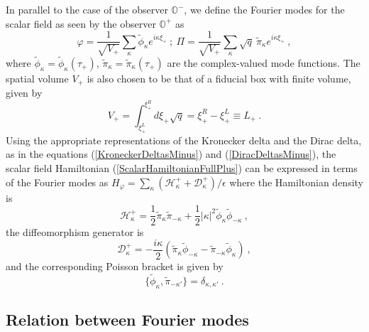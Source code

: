\documentclass[aps,twocolumn,showpacs]{revtex4}
\def\kr{\kappa}
\def\observerminus{\mathbb{O}^{-}}
\def\observerplus{\mathbb{O}^{+}}
\begin{document}
In parallel to the case of the observer $\observerminus$, we define the 
Fourier modes for the scalar field as seen by the observer $\observerplus$
as
%
\begin{equation}\label{FourierModesDefinitionPlus}
\varphi =  \frac{1}{\sqrt{V_{+}}}\sum_{\kr} \tilde{\phi}_{\kr} 
e^{i \kr \xi_{+}} ~;~
\Pi =  \frac{1}{\sqrt{V_{+}}} \sum_{\kr} \sqrt{q}~ \tilde{\pi}_{\kr} 
e^{i \kr \xi_{+}} ~,
\end{equation}
%
where $\tilde{\phi}_{\kr} = \tilde{\phi}_{\kr} (\tau_{+})$, 
$\tilde{\pi}_{\kr} = \tilde{\pi}_{\kr} (\tau_{+})$ are the complex-valued mode 
functions. The spatial volume $V_{+}$ is also chosen to be that of a fiducial 
box with finite volume, given by
%
\begin{equation}\label{SpatialVoumePlus}
V_{+} = \int_{\xi_{+}^L}^{\xi_{+}^R} d\xi_{+}\sqrt{q} = {\xi_{+}^R} - 
{\xi_{+}^L} \equiv L_{+} ~.
\end{equation}
%
Using the appropriate representations of the Kronecker delta and the Dirac 
delta, as in the equations (\ref{KroneckerDeltasMinus}) and 
(\ref{DiracDeltasMinus}), the scalar field Hamiltonian 
(\ref{ScalarHamiltonianFullPlus}) can be expressed in terms of the Fourier 
modes 
as $H_{\varphi} = \sum_{\kr} (\mathcal{H}_{\kr}^{+} + 
\mathcal{D}_{\kr}^{+})/\epsilon$ where the Hamiltonian density is
%
\begin{equation}\label{FourierHamiltonianPlus}
\mathcal{H}_{\kr}^{+} = \frac{1}{2} \tilde{\pi}_{\kr}  \tilde{\pi}_{-\kr}
+ \frac{1}{2} |\kr|^2 \tilde{\phi}_{\kr}  \tilde{\phi}_{-\kr} ~,
\end{equation}
%
the diffeomorphism generator is
%
\begin{equation}\label{FourierDiffeomorphismPlus}
\mathcal{D}_{\kr}^{+} =  
 -\frac{i \kr}{2} \left( \tilde{\pi}_{\kr} \tilde{\phi}_{-\kr} -
 \tilde{\pi}_{-\kr} \tilde{\phi}_{\kr} \right)  ~,
\end{equation}
%
and the corresponding Poisson bracket is given by
%
\begin{equation}\label{FourierPoissonBracketPlus}
\{\tilde{\phi}_{\kr}, \tilde{\pi}_{-\kr'}\} = \delta_{\kr,\kr'} ~.
\end{equation}
%




  
\subsection{Relation between Fourier modes}
       
\end{document}
